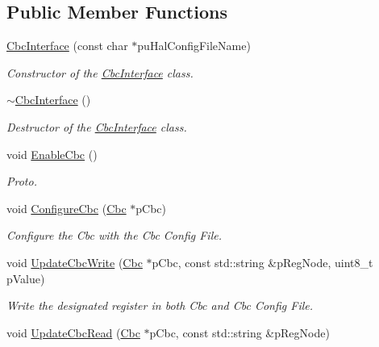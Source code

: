 \subsection*{Public Member Functions}
\begin{DoxyCompactItemize}
\item 
\hyperlink{class_ph2___hw_interface_1_1_cbc_interface_a3ddefe5549da06a7d26fee1502a792b4}{Cbc\-Interface} (const char $\ast$pu\-Hal\-Config\-File\-Name)
\begin{DoxyCompactList}\small\item\em Constructor of the \hyperlink{class_ph2___hw_interface_1_1_cbc_interface}{Cbc\-Interface} class. \end{DoxyCompactList}\item 
\hyperlink{class_ph2___hw_interface_1_1_cbc_interface_a1f0ab7d7cf7783a0fe275e8e1d7e5a49}{$\sim$\-Cbc\-Interface} ()
\begin{DoxyCompactList}\small\item\em Destructor of the \hyperlink{class_ph2___hw_interface_1_1_cbc_interface}{Cbc\-Interface} class. \end{DoxyCompactList}\item 
void \hyperlink{class_ph2___hw_interface_1_1_cbc_interface_a7ed770e36a92cb9fe81d5eca1f0f091b}{Enable\-Cbc} ()
\begin{DoxyCompactList}\small\item\em Proto. \end{DoxyCompactList}\item 
void \hyperlink{class_ph2___hw_interface_1_1_cbc_interface_a0567c7a31f70f446202e60d037c869ea}{Configure\-Cbc} (\hyperlink{class_ph2___hw_description_1_1_cbc}{Cbc} $\ast$p\-Cbc)
\begin{DoxyCompactList}\small\item\em Configure the Cbc with the Cbc Config File. \end{DoxyCompactList}\item 
void \hyperlink{class_ph2___hw_interface_1_1_cbc_interface_aa4daecdb7c91b835dee7520b9e6664f9}{Update\-Cbc\-Write} (\hyperlink{class_ph2___hw_description_1_1_cbc}{Cbc} $\ast$p\-Cbc, const std\-::string \&p\-Reg\-Node, uint8\-\_\-t p\-Value)
\begin{DoxyCompactList}\small\item\em Write the designated register in both Cbc and Cbc Config File. \end{DoxyCompactList}\item 
void \hyperlink{class_ph2___hw_interface_1_1_cbc_interface_a6f9082c399255d69036e97f2ede63754}{Update\-Cbc\-Read} (\hyperlink{class_ph2___hw_description_1_1_cbc}{Cbc} $\ast$p\-Cbc, const std\-::string \&p\-Reg\-Node)

\end{DoxyCompactItemize}
